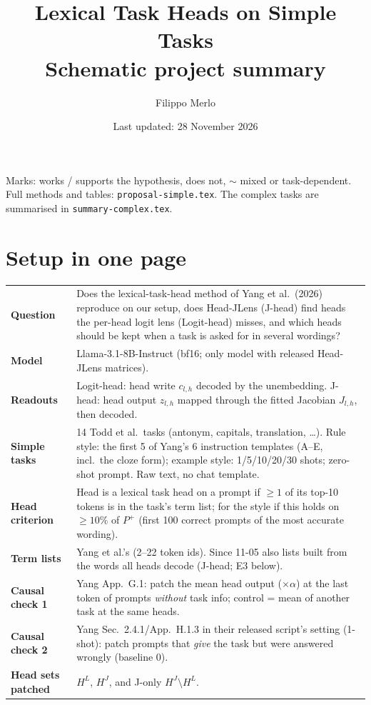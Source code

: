 \documentclass[10pt,a4paper]{article}
\title{Lexical Task Heads on Simple Tasks\\\large Schematic project summary}
\author{Filippo Merlo}
\date{Last updated: 28 November 2026}
\newcommand{\yes}{\textcolor{green!45!black}{\ding{51}}}
\newcommand{\no}{\textcolor{red!70!black}{\ding{55}}}
\newcommand{\mixed}{\textcolor{orange!80!black}{$\sim$}}
\begin{document}
\maketitle
\vspace{-1em}


\noindent Marks: \yes{} works / supports the hypothesis, \no{} does not, \mixed{} mixed or task-dependent. Full methods and tables: \texttt{proposal-simple.tex}. The complex tasks are summarised in \texttt{summary-complex.tex}.

\section{Setup in one page}

\begin{tabularx}{\textwidth}{@{}>{\raggedright\arraybackslash\bfseries}p{2.8cm}L@{}}
\toprule
Question & Does the lexical-task-head method of Yang et al.\ (2026) reproduce on our setup, does Head-JLens (J-head) find heads the per-head logit lens (Logit-head) misses, and which heads should be kept when a task is asked for in several wordings? \\
Model & Llama-3.1-8B-Instruct (bf16; only model with released Head-JLens matrices). \\
Readouts & Logit-head: head write $c_{l,h}$ decoded by the unembedding. J-head: head output $z_{l,h}$ mapped through the fitted Jacobian $J_{l,h}$, then decoded. \\
Simple tasks & 14 Todd et al.\ tasks (antonym, capitals, translation, \dots). Rule style: the first 5 of Yang's 6 instruction templates (A--E, incl.\ the cloze form); example style: 1/5/10/20/30 shots; zero-shot prompt. Raw text, no chat template. \\
Head criterion & Head is a lexical task head on a prompt if $\geq 1$ of its top-10 tokens is in the task's term list; for the style if this holds on $\geq 10\%$ of $P^+$ (first 100 correct prompts of the most accurate wording). \\
Term lists & Yang et al.'s (2--22 token ids). Since 11-05 also lists built from the words all heads decode (J-head; E3 below). \\
Causal check 1 & Yang App.~G.1: patch the mean head output ($\times\alpha$) at the last token of prompts \emph{without} task info; control = mean of another task at the same heads. \\
Causal check 2 & Yang Sec.~2.4.1/App.~H.1.3 in their released script's setting (1-shot): patch prompts that \emph{give} the task but were answered wrongly (baseline 0). \\
Head sets patched & $H^L$, $H^J$, and J-only $H^J\setminus H^L$. \\
\bottomrule
\end{tabularx}
\end{document}

